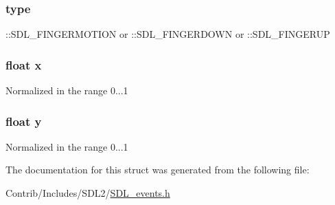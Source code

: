 \subsubsection[{\texorpdfstring{type}{type}}]{ type}\hypertarget{struct_s_d_l___touch_finger_event_aa40a9b05c3154032b9f2d7220e9f08dc}{}\label{struct_s_d_l___touch_finger_event_aa40a9b05c3154032b9f2d7220e9f08dc}
\+::\+S\+D\+L\+\_\+\+F\+I\+N\+G\+E\+R\+M\+O\+T\+I\+ON or \+::\+S\+D\+L\+\_\+\+F\+I\+N\+G\+E\+R\+D\+O\+WN or \+::\+S\+D\+L\+\_\+\+F\+I\+N\+G\+E\+R\+UP 
\subsubsection[{\texorpdfstring{x}{x}}]{\setlength{\rightskip}{0pt plus 5cm}float x}\hypertarget{struct_s_d_l___touch_finger_event_ad0da36b2558901e21e7a30f6c227a45e}{}\label{struct_s_d_l___touch_finger_event_ad0da36b2558901e21e7a30f6c227a45e}
Normalized in the range 0...1 
\subsubsection[{\texorpdfstring{y}{y}}]{\setlength{\rightskip}{0pt plus 5cm}float y}\hypertarget{struct_s_d_l___touch_finger_event_aa4f0d3eebc3c443f9be81bf48561a217}{}\label{struct_s_d_l___touch_finger_event_aa4f0d3eebc3c443f9be81bf48561a217}
Normalized in the range 0...1 

The documentation for this struct was generated from the following file\+:\begin{DoxyCompactItemize}
\item 
Contrib/\+Includes/\+S\+D\+L2/\hyperlink{_s_d_l__events_8h}{S\+D\+L\+\_\+events.\+h}\end{DoxyCompactItemize}
